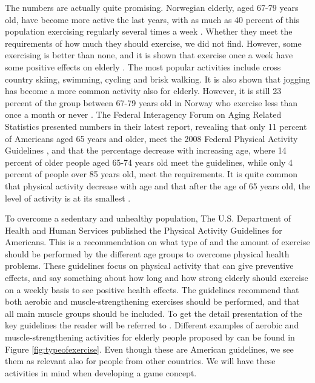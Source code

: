 The numbers are actually quite promising. Norwegian elderly, aged  67-79 years old, have become more active the last years, with as much as 40 percent of this population exercising regularly several times a week \cite{statisticsnorway}. Whether they meet the requirements of how much they should exercise, we did not find. However, some exercising is better than none, and it is shown that exercise once a week have some positive effects on elderly \cite{gruppetrening-trheim}. The most popular activities include cross country skiing, swimming, cycling and brisk walking. It is also shown that jogging has become a more common activity also for elderly. However, it is still 23 percent of the group between 67-79 years old in Norway who exercise less than once a month or never \cite{statisticsnorway}. The Federal Interagency Forum on Aging Related Statistics \cite{olderamericans} presented numbers in their latest report, revealing that only 11 percent of Americans aged 65 years and older, meet the 2008 Federal Physical Activity Guidelines \cite{guidelines}, and that the percentage decrease with increasing age, where 14 percent of older people aged 65-74 years old meet the guidelines, while only 4 percent of people over 85 years old, meet the requirements.  It is quite common that physical activity decrease with age and that after the age of 65 years old, the level of activity is at its smallest \cite{schutzer}. 
 
To overcome a sedentary and unhealthy population, The U.S. Department of Health and Human Services published the Physical Activity Guidelines for Americans. This is a recommendation on what type of and the amount of exercise should be performed by the different age groups to overcome physical health problems. These guidelines focus on physical activity that can give preventive effects, and say something about how long and how strong elderly should exercise on a weekly basis to see positive health effects. The guidelines recommend that both aerobic and muscle-strengthening exercises should be performed, and that all main muscle groups should be included. To get the detail presentation of the key guidelines the reader will be referred to \cite{guidelines}.  Different examples of aerobic and muscle-strengthening activities for elderly people proposed by \cite{guidelines} can be found in Figure \ref{fig:typeofexercise}. Even though these are American guidelines, we see them as relevant also for people from other countries. We will have these activities in mind when developing a game concept.

